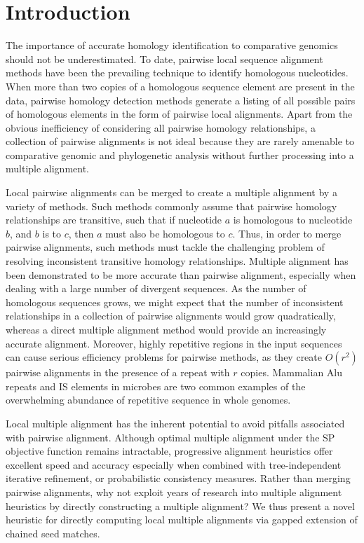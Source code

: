 \documentclass{ws-procs975x65}
\begin{document}

\section{Introduction}
The importance of accurate homology identification to comparative
genomics should not be underestimated\cite{Kumar07}. To date, pairwise
local sequence alignment methods\cite{ref-blastz,ref-ssearch} have
been the prevailing technique to identify homologous nucleotides.
When more than two copies of a homologous sequence element are present
in the data, pairwise homology detection methods generate a listing of
all possible pairs of homologous elements in the form of pairwise
local alignments.  Apart from the obvious inefficiency of considering
all pairwise homology relationships, a collection of pairwise
alignments is not ideal because they are rarely amenable to
comparative genomic and phylogenetic analysis without further
processing into a multiple alignment.

Local pairwise alignments can be merged to create a multiple alignment
by a variety of
methods\cite{ref-tba,ref-aba,ref-dialign,ref-related1}. Such methods
commonly assume that pairwise homology relationships are transitive,
such that if nucleotide $a$ is homologous to nucleotide $b$, and $b$
is to $c$, then $a$ must also be homologous to $c$.  Thus, in order to
merge pairwise alignments, such methods must tackle the challenging
problem of resolving inconsistent transitive homology relationships.
Multiple alignment has been demonstrated to be more accurate than
pairwise alignment, especially when dealing with a large number of
divergent sequences\cite{ref-mlagan,ref-aubergene}.  As the number of
homologous sequences grows, we might expect that the number of
inconsistent relationships in a collection of pairwise alignments
would grow quadratically, whereas a direct multiple alignment method
would provide an increasingly accurate alignment.  Moreover, highly repetitive
regions in the input sequences can cause serious efficiency problems
for pairwise methods, as they create $O(r^{2})$ pairwise alignments in
the presence of a repeat with $r$ copies.  Mammalian Alu repeats and
IS elements in microbes are two common examples of the overwhelming
abundance of repetitive sequence in whole genomes.

Local multiple alignment has the inherent potential to avoid pitfalls
associated with pairwise alignment. Although optimal multiple
alignment under the SP objective function remains
intractable\cite{ref-wangjiang}, progressive alignment heuristics
offer excellent speed and accuracy\cite{ref-clustalw,ref-tcoffee}
especially when combined with tree-independent iterative
refinement\cite{ref-muscle}, or probabilistic consistency
measures\cite{ref-probcons}. Rather than merging pairwise alignments,
why not exploit years of research into multiple alignment heuristics
by directly constructing a multiple alignment? We thus present a novel
heuristic for directly computing local multiple alignments via gapped
extension of chained seed matches.
\end{document}
